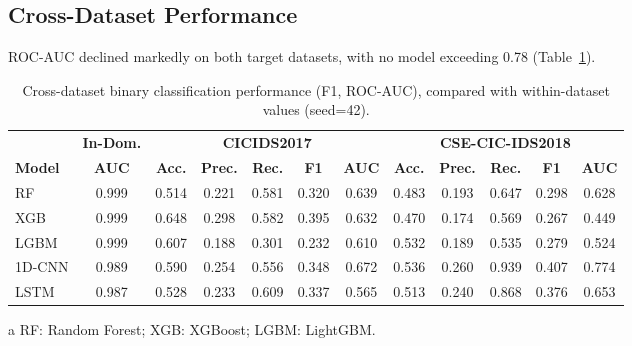 \documentclass[a4paper,fleqn]{cas-sc}
\begin{document}
\FloatBarrier
\subsection{Cross-Dataset Performance}

ROC-AUC declined markedly on both target datasets, with no model exceeding 0.78 (Table~\ref{tbl7}).

\begin{table}[width=\textwidth,cols=11,pos=htbp]
\caption{Cross-dataset binary classification performance (F1, ROC-AUC), compared with within-dataset values (seed=42).}
\label{tbl7}
\begin{threeparttable}
\footnotesize
\setlength{\tabcolsep}{2.6pt}
\renewcommand{\arraystretch}{0.95}
\begin{tabular}{@{}l c ccccc ccccc@{}}
\toprule
& \textbf{In-Dom.} & \multicolumn{5}{c}{\textbf{CICIDS2017}} & \multicolumn{5}{c}{\textbf{CSE-CIC-IDS2018}} \\
\cmidrule(lr){3-7} \cmidrule(lr){8-12}
\textbf{Model} & \textbf{AUC} & \textbf{Acc.} & \textbf{Prec.} & \textbf{Rec.} & \textbf{F1} & \textbf{AUC} & \textbf{Acc.} & \textbf{Prec.} & \textbf{Rec.} & \textbf{F1} & \textbf{AUC} \\
\midrule
RF      & 0.999 & 0.514 & 0.221 & 0.581 & 0.320 & 0.639 & 0.483 & 0.193 & 0.647 & 0.298 & 0.628 \\
XGB     & 0.999 & 0.648 & 0.298 & 0.582 & 0.395 & 0.632 & 0.470 & 0.174 & 0.569 & 0.267 & 0.449 \\
LGBM    & 0.999 & 0.607 & 0.188 & 0.301 & 0.232 & 0.610 & 0.532 & 0.189 & 0.535 & 0.279 & 0.524 \\
1D-CNN  & 0.989 & 0.590 & 0.254 & 0.556 & 0.348 & 0.672 & 0.536 & 0.260 & 0.939 & 0.407 & 0.774 \\
LSTM    & 0.987 & 0.528 & 0.233 & 0.609 & 0.337 & 0.565 & 0.513 & 0.240 & 0.868 & 0.376 & 0.653 \\
\bottomrule
\end{tabular}
\begin{tablenotes}
\footnotesize
\item[a] RF: Random Forest; XGB: XGBoost; LGBM: LightGBM.
\end{tablenotes}
\end{threeparttable}
\end{table}
\end{document}
